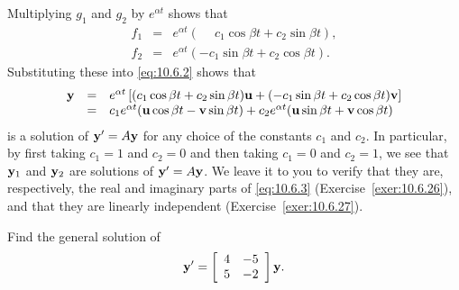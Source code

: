Multiplying $g_{1}$ and $g_{2}$ by $e^{\alpha t}$ shows that
\begin{eqnarray*}
  f_{1} & = & e^{\alpha t}(\phantom{-}c_{1}\cos\beta t+c_{2}\sin\beta t), \\
  f_{2} & = & e^{\alpha t}(-c_{1}\sin\beta t+c_{2}\cos\beta t).
\end{eqnarray*}
Substituting these into \eqref{eq:10.6.2} shows that
\begin{equation}
  \label{eq:10.6.5}
  \begin{array}{rcl}
    {\bf y} & = & e^{\alpha t}\left[(c_{1}\cos\beta t+c_{2}\sin\beta t){\bf u} +(-c_{1}\sin\beta t+c_{2}\cos\beta t){\bf v}\right]   \\
            & = & c_{1}e^{\alpha t}({\bf u}\cos\beta t-{\bf v}\sin\beta t) +c_{2}e^{\alpha t}({\bf u}\sin\beta t+{\bf v}\cos\beta t)
  \end{array}
\end{equation}
is a solution of ${\bf y}'=A{\bf y}$ for any choice of the constants $c_{1}$ and $c_{2}$. In
particular, by first taking $c_{1}=1$ and $c_{2}=0$ and then taking $c_{1}=0$ and $c_{2}=1$, we see
that ${\bf y}_{1}$ and ${\bf y}_{2}$ are solutions of ${\bf y}'=A{\bf y}$. We leave it to you to
verify that they are, respectively, the real and imaginary parts of \eqref{eq:10.6.3}
(Exercise~\ref{exer:10.6.26}), and that they are linearly independent (Exercise~\ref{exer:10.6.27}).

\begin{example}
  \label{example:10.6.1} \rm Find the general solution of
  \begin{equation}
    \label{eq:10.6.6}{\bf y}'=\left[\begin{array}{rr} 4&-5\\5&-2\end{array}\right]{\bf y}.
  \end{equation}
\end{example}

